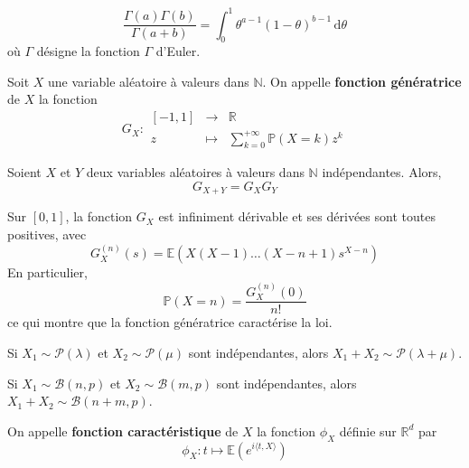   \begin{application}
    \[ \frac{\Gamma(a) \Gamma(b)}{\Gamma(a+b)} = \int_0^1 \theta^{a-1} (1-\theta)^{b-1} \, \mathrm{d}\theta \]
    où $\Gamma$ désigne la fonction $\Gamma$ d'Euler.
  \end{application}


  \begin{definition}
    Soit $X$ une variable aléatoire à valeurs dans $\mathbb{N}$. On appelle \textbf{fonction génératrice} de $X$ la fonction
    \[
    G_X :
    \begin{array}{ccc}
      [-1,1] &\rightarrow& \mathbb{R} \\
      z &\mapsto& \sum_{k=0}^{+\infty} \mathbb{P}(X=k) z^k
    \end{array}
    \]
  \end{definition}

  \begin{proposition}
    Soient $X$ et $Y$ deux variables aléatoires à valeurs dans $\mathbb{N}$ indépendantes. Alors,
    \[ G_{X+Y} = G_X G_Y \]
  \end{proposition}

  \begin{theorem}
    Sur $[0,1]$, la fonction $G_X$ est infiniment dérivable et ses dérivées sont toutes positives, avec
    \[ G_X^{(n)}(s) = \mathbb{E}(X(X-1) \dots (X-n+1)s^{X-n}) \]
    En particulier,
    \[ \mathbb{P}(X=n) = \frac{G_X^{(n)}(0)}{n!} \]
    ce qui montre que la fonction génératrice caractérise la loi.
  \end{theorem}

  \begin{example}
    Si $X_1 \sim \mathcal{P}(\lambda)$ et $X_2 \sim \mathcal{P}(\mu)$ sont indépendantes, alors $X_1 + X_2 \sim \mathcal{P}(\lambda + \mu)$.
  \end{example}


  \begin{example}
    Si $X_1 \sim \mathcal{B}(n, p)$ et $X_2 \sim \mathcal{B}(m, p)$ sont indépendantes, alors $X_1 + X_2 \sim \mathcal{B}(n + m, p)$.
  \end{example}


  \begin{definition}
    On appelle \textbf{fonction caractéristique} de $X$ la fonction $\phi_X$ définie sur $\mathbb{R}^d$ par
    \[ \phi_X : t \mapsto \mathbb{E}\left( e^{i \langle t, X \rangle} \right) \]
  \end{definition}

